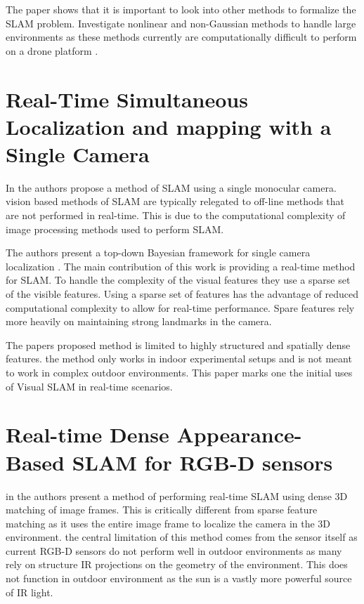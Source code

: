 \documentclass[conference]{IEEEtran}
\begin{document}
The paper shows that it is important to look into other methods to formalize the SLAM problem. Investigate nonlinear and non-Gaussian methods to handle large environments as these methods currently are computationally difficult to perform on a drone platform \cite{juanlimits}.

\section{Real-Time Simultaneous Localization and mapping with a Single Camera}
In \cite{davison2003real} the authors propose a method of SLAM using a single monocular camera. vision based methods of SLAM are typically relegated to off-line methods that are not performed in real-time. This is due to the computational complexity of image processing methods used to perform SLAM.

The authors present a top-down Bayesian framework for single camera localization \cite{davison2003real}. The main contribution of this work is providing a real-time method for SLAM. To handle the complexity of the visual features they use a sparse set of the visible features. Using a sparse set of features has the advantage of reduced computational complexity to allow for real-time performance. Spare features rely more heavily on maintaining strong landmarks in the camera.

The papers proposed method is limited to highly structured and spatially dense features. the method only works in indoor experimental setups and is not meant to work in complex outdoor environments. This paper marks one the initial uses of Visual SLAM in real-time scenarios.
\section{Real-time Dense Appearance-Based SLAM for RGB-D sensors}
in \cite{audras2011real} the authors present a method of performing real-time SLAM using dense 3D matching of image frames. This is critically different from sparse feature matching as it uses the entire image frame to localize the camera in the 3D environment. the central limitation of this method comes from the sensor itself as current RGB-D sensors do not perform well in outdoor environments as many rely on structure IR projections on the geometry of the environment. This does not function in outdoor environment as the sun is a vastly more powerful source of IR light.
\end{document}
